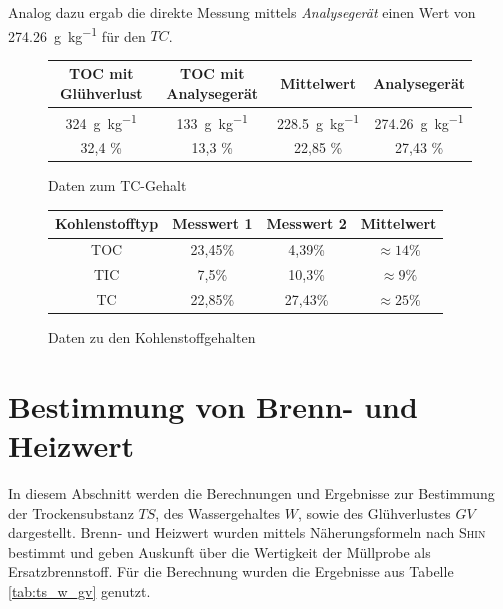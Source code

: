 Analog dazu ergab die direkte Messung mittels \textit{Analysegerät} einen Wert von \SI{274,26}{\gram \per \kg} für den $TC$.
\vspace*{-5mm}
\begin{figure}[h!]
\renewcommand{\arraystretch}{1.2}
	\centering
	\caption{Daten zum TC-Gehalt}
	\begin{tabular}{c|c|c||c}
	\hline
	\textbf{TOC mit Glühverlust} & \textbf{TOC mit Analysegerät} & \textbf{Mittelwert} & \textbf{Analysegerät} \\
	\hline
	\SI{324}{\gram \per \kg} & \SI{133}{\gram \per \kg} & \SI{228,5}{\gram \per \kg} & \SI{274,26}{\gram \per \kg}\\
	\hline
	 32,4 \% & 13,3 \% & 22,85 \% & 27,43 \%\\
	\hline
	\end{tabular}
\end{figure}
\FloatBarrier

\vspace*{-5mm}
\begin{figure}[h!]
	\renewcommand{\arraystretch}{1.2}
	\centering
	\caption{Daten zu den Kohlenstoffgehalten}
	\label{tab:tc}
	\begin{tabular}{c|c|c||c}
		\hline
		\textbf{Kohlenstofftyp} & \textbf{Messwert 1} & \textbf{Messwert 2} & \textbf{Mittelwert}  \\
		\hline
		TOC		&	23,45\%		& 4,39\%	& $\approx 14\%$\\
		TIC		&	7,5\%		& 10,3\%	& $\approx 9\%$ \\
		TC		&	22,85\%		& 27,43\%	& $\approx 25\%$ \\
		\hline
	\end{tabular}
\end{figure}
\FloatBarrier

\newpage

\section{Bestimmung von Brenn- und Heizwert}
In diesem Abschnitt werden die Berechnungen und Ergebnisse zur Bestimmung der Trockensubstanz $TS$, des Wassergehaltes $W$, sowie des Glühverlustes $GV$ dargestellt. \linebreak
Brenn- und Heizwert wurden mittels Näherungsformeln nach \textsc{Shin} bestimmt und geben Auskunft über die Wertigkeit der Müllprobe als Ersatzbrennstoff. Für die Berechnung wurden die Ergebnisse aus Tabelle \ref{tab:ts_w_gv} genutzt.

\vspace*{3mm}

